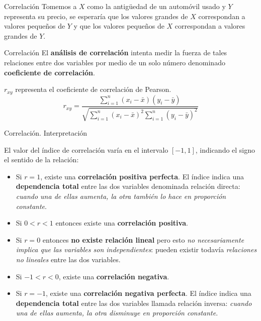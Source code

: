 \documentclass[11pt]{beamer}
\begin{document}
       \begin{frame}{Correlación}
         Tomemos a $X$ como la antigüedad de un automóvil usado y $Y$ representa su
precio, se esperaría que los valores grandes de $X$ correspondan a
valores pequeños de $Y$ y que los valores pequeños de $X$ correspondan a valores grandes
de $Y$.
         \pause
         \begin{block}{Correlación}
           El \textbf{análisis de correlación} intenta medir la fuerza de tales relaciones entre dos variables por medio de un solo número denominado \textbf{coeficiente de correlación}.
         \end{block}
         \pause
         $r_{xy}$ representa el coeficiente de correlación de Pearson.
         $$ r_{xy}=\dfrac{\sum _{i=1}^{n}(x_i-\bar {x})(y_i-\bar {y})}{\sqrt{\sum _{i=1}^{n}(x_i-\bar {x})^2\sum _{i=1}^{n}(y_i-\bar {y})^2}}  $$

        \end{frame}

        \begin{frame}{Correlación. Interpretación}

            El valor del índice de correlación varía en el intervalo $[-1,1]$, indicando el signo el sentido de la relación:
            \begin{itemize}
                \item Si $r=1$, existe una \textbf{correlación positiva perfecta}. El índice indica una \textbf{dependencia total} entre las dos variables denominada relación directa: \textit{cuando una de ellas aumenta, la otra también lo hace en proporción constante}.
                \pause
                \item Si $0<r<1$ entonces existe una \textbf{correlación positiva}.
                \pause
                \item Si $r=0$ entonces \textbf{no existe relación lineal} pero esto \textit{no necesariamente implica que las variables son independientes}: pueden existir todavía \textit{relaciones no lineales} entre las dos variables.
                \pause
                \item Si $-1<r<0$, existe una \textbf{correlación negativa}.
                \pause
                \item Si $r=-1$, existe una \textbf{correlación negativa perfecta}. El índice indica una \textbf{dependencia total} entre las dos variables llamada relación inversa: \textit{cuando una de ellas aumenta, la otra disminuye en proporción constante}.
            \end{itemize}
        \end{frame}

        \begin{frame}{}

        \end{frame}
\end{document}
